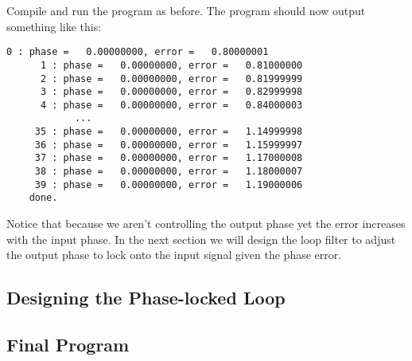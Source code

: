 %
Compile and run the program as before.
The program should now output something like this:
%
\begin{Verbatim}[fontsize=\small]
      0 : phase =   0.00000000, error =   0.80000001
      1 : phase =   0.00000000, error =   0.81000000
      2 : phase =   0.00000000, error =   0.81999999
      3 : phase =   0.00000000, error =   0.82999998
      4 : phase =   0.00000000, error =   0.84000003
            ...
     35 : phase =   0.00000000, error =   1.14999998
     36 : phase =   0.00000000, error =   1.15999997
     37 : phase =   0.00000000, error =   1.17000008
     38 : phase =   0.00000000, error =   1.18000007
     39 : phase =   0.00000000, error =   1.19000006
    done.
\end{Verbatim}
%
Notice that because we aren't controlling the output phase yet
the error increases with the input phase.
In the next section we will design the loop filter to adjust the output
phase to lock onto the input signal given the phase error.

\subsection{Designing the Phase-locked Loop}
\label{tutorial:pll:design}


\subsection{Final Program}
\label{tutorial:pll:completed}

